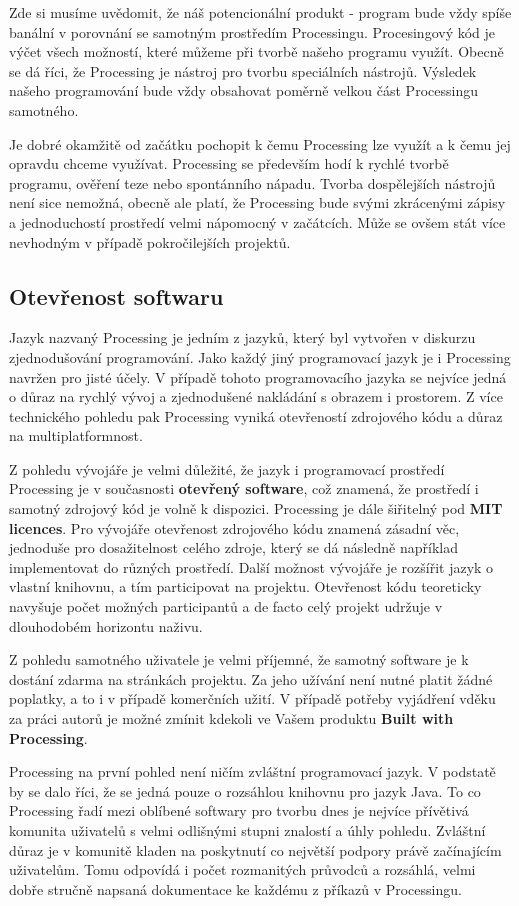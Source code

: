 \documentclass[11pt]{book}
\newcommand{\pododdil}[1]{\subsection{#1}\label{subsec:#1}}
\newcommand{\slovnik}[1]{\textbf{\gls{#1}}\index{#1}}
\newcommand{\slovnikpl}[1]{\textbf{\glspl{#1}}\index{#1}}
\begin{document}
Zde si musíme uvědomit, že náš potencionální produkt - program bude vždy spíše banální v porovnání se samotným prostředím Processingu. Procesingový kód je výčet všech možností, které můžeme při tvorbě našeho programu využít. Obecně se dá říci, že Processing je nástroj pro tvorbu speciálních nástrojů. Výsledek našeho programování bude vždy obsahovat poměrně velkou část Processingu samotného.

Je dobré okamžitě od začátku pochopit k čemu Processing lze využít a k čemu jej opravdu chceme využívat. Processing se především hodí k rychlé tvorbě programu, ověření teze nebo spontánního nápadu. Tvorba dospělejších nástrojů není sice nemožná, obecně ale platí, že Processing bude svými zkrácenými zápisy a jednoduchostí prostředí velmi nápomocný v začátcích. Může se ovšem stát více nevhodným v případě pokročilejších projektů. 


\pododdil{Otevřenost softwaru}

Jazyk nazvaný Processing je jedním z jazyků, který byl vytvořen v diskurzu zjednodušování programování. Jako každý jiný programovací jazyk je i Processing navržen pro jisté účely. V případě tohoto programovacího jazyka se nejvíce jedná o důraz na rychlý vývoj a zjednodušené nakládání s obrazem i prostorem. Z více technického pohledu pak Processing vyniká otevřeností zdrojového kódu a důraz na multiplatformnost.

Z pohledu vývojáře je velmi důležité, že jazyk i programovací prostředí Processing je v současnosti \slovnik{otevřený software}, což znamená, že prostředí i samotný zdrojový kód je volně k dispozici. Processing je dále šiřitelný pod \slovnikpl{MIT licence}. Pro vývojáře otevřenost zdrojového kódu znamená zásadní věc, jednoduše pro dosažitelnost celého zdroje, který se dá následně například implementovat do různých prostředí. Další možnost vývojáře je rozšířit jazyk o vlastní knihovnu, a tím participovat na projektu. Otevřenost kódu teoreticky navyšuje počet možných participantů a de facto celý projekt udržuje v dlouhodobém horizontu naživu.

Z pohledu samotného uživatele je velmi příjemné, že samotný software je k dostání zdarma na stránkách projektu. Za jeho užívání není nutné platit žádné poplatky, a to i v případě komerčních užití. V případě potřeby vyjádření vděku za práci autorů je možné zmínit kdekoli ve Vašem produktu \slovnik{Built with Processing}.


Processing na první pohled není ničím zvláštní programovací jazyk. V podstatě by se dalo říci, že se jedná pouze o rozsáhlou knihovnu pro jazyk Java. To co Processing řadí mezi oblíbené softwary pro tvorbu dnes je nejvíce přívětivá komunita uživatelů s velmi odlišnými stupni znalostí a úhly pohledu. Zvláštní důraz je v komunitě kladen na poskytnutí co největší podpory právě začínajícím uživatelům. Tomu odpovídá i počet rozmanitých průvodců a rozsáhlá, velmi dobře stručně napsaná dokumentace ke každému z příkazů v Processingu.
\end{document}
